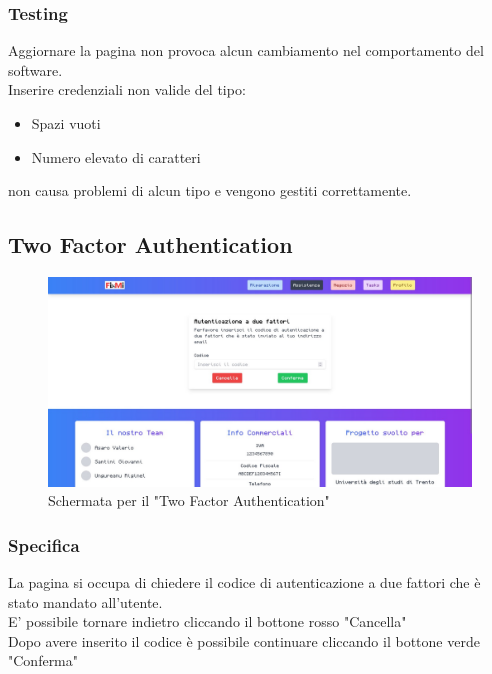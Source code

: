 \documentclass{report}
\begin{document}
\subsubsection*{Testing}
Aggiornare la pagina non provoca alcun cambiamento nel comportamento del software.\\Inserire credenziali non valide del tipo:
\begin{itemize}
	\item Spazi vuoti
	\item Numero elevato di caratteri
\end{itemize}
non causa problemi di alcun tipo e vengono gestiti correttamente.


\subsection{Two Factor Authentication}

\begin{figure}[H]
	\centering\includegraphics[width=1\textwidth]{images/microservizio-autenticazione/frontend/twofa.jpg}
	Schermata per il "Two Factor Authentication"
\end{figure}
\subsubsection*{Specifica}
La pagina si occupa di chiedere il codice di autenticazione a due fattori che è stato mandato all'utente.\\
E' possibile tornare indietro cliccando il bottone rosso "Cancella"\\
Dopo avere inserito il codice è possibile continuare cliccando il bottone verde "Conferma"
\end{document}
